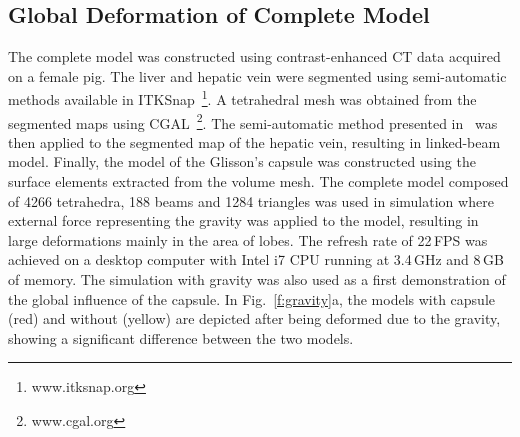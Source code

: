 



\subsection{Global Deformation of Complete Model}
The complete model was constructed using contrast-enhanced CT data acquired on a female pig.
The liver and hepatic vein were segmented using semi-automatic methods available in ITKSnap~\footnote{www.itksnap.org}.
A tetrahedral mesh was obtained from the segmented maps using CGAL~\footnote{www.cgal.org}.
The semi-automatic method presented in~\cite{Peterlik2012} was
then applied to the segmented map of the hepatic vein, resulting in linked-beam model.
Finally, the model of the Glisson's capsule was constructed using the surface elements extracted from the volume mesh.
The complete model composed of 4266 tetrahedra, 188 beams and 1284 triangles was 
used in simulation where external force representing the gravity was applied to the model,
resulting in large deformations mainly in the area of lobes. The refresh rate of 22\,FPS
was achieved on a desktop computer with Intel i7 CPU running at 3.4\,GHz and 8\,GB of memory.
The simulation with gravity was also used as a first demonstration of the global influence of the capsule.
In Fig.~\ref{f:gravity}a, the models with capsule (red) and without (yellow) are depicted after being
deformed due to the gravity, showing a significant difference between the two models.



